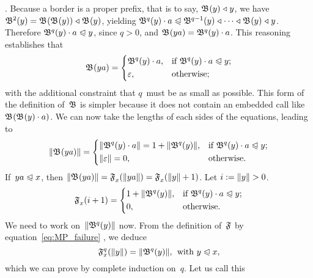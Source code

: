 \prefeq {}\). Because a border is a proper prefix, that
is to say, \(\mathfrak{B}^{}(y) \mathrel{\triangleleft} y\), we have \(\mathfrak{B}^{2}(y) =
\mathfrak{B}^{}(\mathfrak{B}^{}(y)) \mathrel{\triangleleft} \mathfrak{B}^{}(y)\), yielding \(\Border{q}{y}
\cdot a \prefeq \Border{q-1}{y} \pref \dots \pref \Border{}{y} \pref
y\). Therefore \(\mathfrak{B}^{q}(y) \cdot a \mathrel{\trianglelefteqslant} y\), since \({q > 0}\),
and \(\mathfrak{B}^{}(ya) = \mathfrak{B}^{q}(y) \cdot a\). This reasoning
establishes that
\begin{equation*}
\mathfrak{B}^{}(ya) = 
\left\{
  \begin{aligned}
   & \mathfrak{B}^{q}(y) \cdot a,
   && \text{if \(\mathfrak{B}^{q}(y) \cdot a \mathrel{\trianglelefteqslant}y\)};\\
   & \varepsilon, 
   && \text{otherwise;}
  \end{aligned}
\right.
\end{equation*}
with the additional constraint that \(q\)~must be as small as
possible. This form of the definition of~\(\mathfrak{B}\) is simpler
because it does not contain an embedded call like
\(\mathfrak{B}^{}(\mathfrak{B}^{}(y) \cdot a)\). We can now take the lengths of
each sides of the equations, leading to
\begin{equation*}
\lVert{\mathfrak{B}^{}(ya)}\rVert{} = 
\left\{
  \begin{aligned}
   & \lVert{\mathfrak{B}^{q}(y) \cdot a}\rVert{} = 1 + \lVert{\mathfrak{B}^{q}(y)}\rVert{},
   && \text{if \(\mathfrak{B}^{q}(y) \cdot a \mathrel{\trianglelefteqslant}y\)};\\
   & \lVert{\varepsilon}\rVert{} = 0,
   && \text{otherwise.}
  \end{aligned}
\right.
\end{equation*}
If~\({ya \mathrel{\trianglelefteqslant} x}\), then \(\lVert{\mathfrak{B}^{}(ya)}\rVert{} =
\mathfrak{F}_{x}^{}(\lVert{ya}\rVert{}) = \mathfrak{F}_{x}^{}(\lVert{y}\rVert{}+1)\). Let \(i :=
\lVert{y}\rVert{} > 0\).
\begin{equation*}
\mathfrak{F}_{x}^{}(i+1) =
\left\{
  \begin{aligned}
   & 1 + \lVert{\mathfrak{B}^{q}(y)}\rVert{},
   && \text{if \(\mathfrak{B}^{q}(y) \cdot a \mathrel{\trianglelefteqslant}y\)};\\
   & 0,
   && \text{otherwise.}
  \end{aligned}
\right.
\end{equation*}
We need to work on~\(\lVert{\mathfrak{B}^{q}(y)}\rVert{}\) now. From the definition
of~\(\mathfrak{F}\) by equation~\eqref{eq:MP_failure}
, we deduce
\begin{equation}
\mathfrak{F}_{x}^{q}(\lVert{y}\rVert{}) = \lVert{\mathfrak{B}^{q}(y)}\rVert{},
\,\; \text{with \(y \mathrel{\trianglelefteqslant}x\)},
\label{eq:MP_failure_p}
\end{equation}
which we can prove by complete induction on~\(q\). Let us call this

